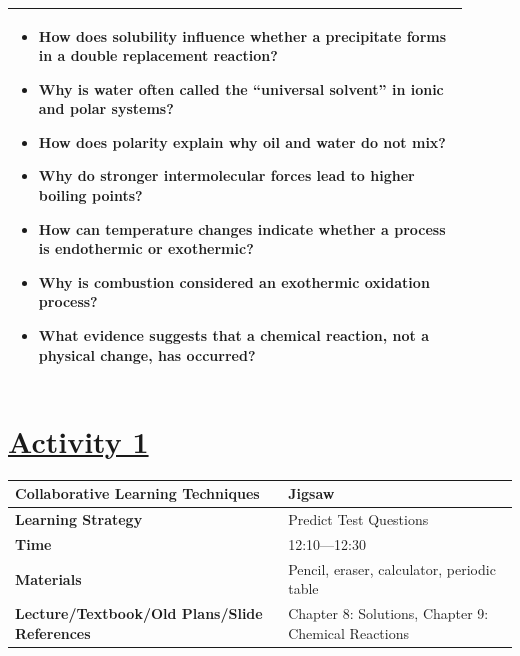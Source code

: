 \documentclass{article}
\begin{document}
\begin{tabular}{|p{0.9\linewidth}|}
\begin{itemize}
\item How does solubility influence whether a precipitate forms in a double replacement reaction?
\item Why is water often called the “universal solvent” in ionic and polar systems?
\item How does polarity explain why oil and water do not mix?
\item Why do stronger intermolecular forces lead to higher boiling points?
\item How can temperature changes indicate whether a process is endothermic or exothermic?
\item Why is combustion considered an exothermic oxidation process?
\item What evidence suggests that a chemical reaction, not a physical change, has occurred?
\end{itemize}\\
\hline
\end{tabular}


\newpage

\section*{\underline{Activity 1}}
\vspace{0.2cm}
\begin{tabular}{|p{4.2cm}|p{9.8cm}|}
\hline
\textbf{Collaborative Learning Techniques} & Jigsaw\\
\hline
\textbf{Learning Strategy} & Predict Test Questions \\
\hline
\textbf{Time} & 12:10---12:30\\
\hline
\textbf{Materials} & Pencil, eraser, calculator, periodic table \\
\hline
\textbf{Lecture/Textbook/Old Plans/Slide References} & Chapter 8: Solutions, Chapter 9: Chemical Reactions \\
\hline
\end{tabular}
\vspace{0.5cm}
\end{document}
